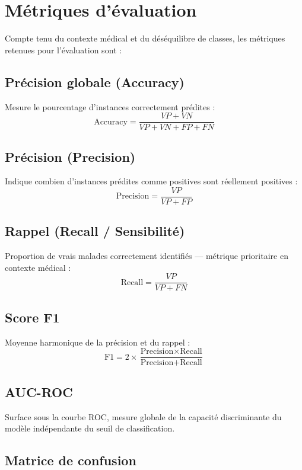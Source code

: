 \documentclass[12pt,a4paper]{report}
\begin{document}
\section{Métriques d'évaluation}

Compte tenu du contexte médical et du déséquilibre de classes, les métriques
retenues pour l'évaluation sont :

\subsection{Précision globale (Accuracy)}

Mesure le pourcentage d'instances correctement prédites :
\[
\text{Accuracy} = \frac{VP + VN}{VP + VN + FP + FN}
\]

\subsection{Précision (Precision)}

Indique combien d'instances prédites comme positives sont réellement positives :
\[
\text{Precision} = \frac{VP}{VP + FP}
\]

\subsection{Rappel (Recall / Sensibilité)}

Proportion de vrais malades correctement identifiés --- métrique prioritaire en
contexte médical :
\[
\text{Recall} = \frac{VP}{VP + FN}
\]

\subsection{Score F1}

Moyenne harmonique de la précision et du rappel :
\[
\text{F1} = 2 \times \frac{\text{Precision} \times \text{Recall}}{\text{Precision} + \text{Recall}}
\]

\subsection{AUC-ROC}

Surface sous la courbe \acs{ROC}, mesure globale de la capacité discriminante du
modèle indépendante du seuil de classification.

\subsection{Matrice de confusion}
\end{document}
